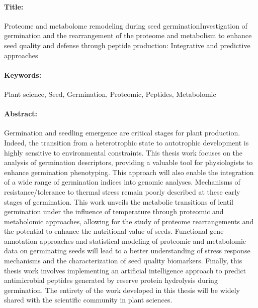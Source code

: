 \documentclass[12pt,a4paper]{reedthesis}
\begin{document}
\begin{mdframed}[linecolor=Prune,linewidth=1]
\vspace{-.25cm}
\paragraph*{Title:} Proteome and metabolome remodeling during seed germinationInvestigation of germination and the rearrangement of the proteome and metabolism to enhance seed quality and defense through peptide production: Integrative and predictive approaches

\begin{small}
\vspace{-.25cm}
\paragraph*{Keywords:} Plant science, Seed, Germination, Proteomic, Peptides, Metabolomic

\vspace{-.5cm}
\begin{multicols}{2}
\paragraph*{Abstract:} Germination and seedling emergence are critical stages for plant production. Indeed, the transition from a heterotrophic state to autotrophic development is highly sensitive to environmental constraints. This thesis work focuses on the analysis of germination descriptors, providing a valuable tool for physiologists to enhance germination phenotyping. This approach will also enable the integration of a wide range of germination indices into genomic analyses. Mechanisms of resistance/tolerance to thermal stress remain poorly described at these early stages of germination. This work unveils the metabolic transitions of lentil germination under the influence of temperature through proteomic and metabolomic approaches, allowing for the study of proteome rearrangements and the potential to enhance the nutritional value of seeds. Functional gene annotation approaches and statistical modeling of proteomic and metabolomic data on germinating seeds will lead to a better understanding of stress response mechanisms and the characterization of seed quality biomarkers. Finally, this thesis work involves implementing an artificial intelligence approach to predict antimicrobial peptides generated by reserve protein hydrolysis during germination. The entirety of the work developed in this thesis will be widely shared with the scientific community in plant sciences.
\end{multicols}
\end{small}
\end{mdframed}
\end{document}
